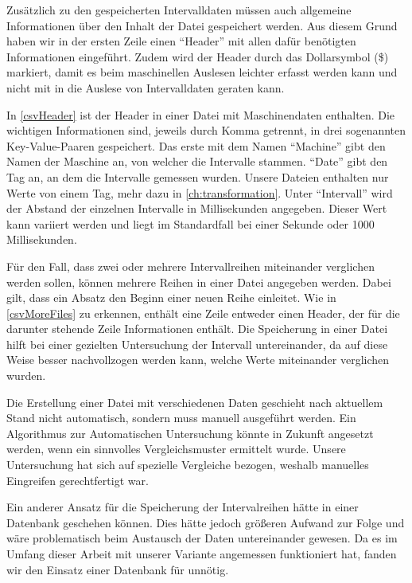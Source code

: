 \newpage
{}
Zusätzlich zu den gespeicherten Intervalldaten müssen auch allgemeine Informationen über den Inhalt der Datei gespeichert werden. Aus diesem Grund haben wir in der ersten Zeile einen \enquote{Header} mit allen dafür benötigten Informationen eingeführt. Zudem wird der Header durch das Dollarsymbol (\$) markiert, damit es beim maschinellen Auslesen leichter erfasst werden kann und nicht mit in die Auslese von Intervalldaten geraten kann.


In \autoref{csvHeader} ist der Header in einer Datei mit Maschinendaten enthalten. Die wichtigen Informationen sind, jeweils durch Komma getrennt, in drei sogenannten Key-Value-Paaren gespeichert. Das erste mit dem Namen \enquote{Machine} gibt den Namen der Maschine an, von welcher die Intervalle stammen. \enquote{Date} gibt den Tag an, an dem die Intervalle gemessen wurden. Unsere Dateien enthalten nur Werte von einem Tag, mehr dazu in \autoref{ch:transformation}. Unter \enquote{Intervall} wird der Abstand der einzelnen Intervalle in Millisekunden angegeben. Dieser Wert kann variiert werden und liegt im Standardfall bei einer Sekunde oder 1000 Millisekunden.

\vspace{60pt}


\newpage
{}
Für den Fall, dass zwei oder mehrere Intervallreihen miteinander verglichen werden sollen, können mehrere Reihen in einer Datei angegeben werden. Dabei gilt, dass ein Absatz den Beginn einer neuen Reihe einleitet. Wie in \autoref{csvMoreFiles} zu erkennen, enthält eine Zeile entweder einen Header, der für die darunter stehende Zeile Informationen enthält. Die Speicherung in einer Datei hilft bei einer gezielten Untersuchung der Intervall untereinander, da auf diese Weise besser nachvollzogen werden kann, welche Werte miteinander verglichen wurden.

\vspace{30pt}



\vspace{20pt}
Die Erstellung einer Datei mit verschiedenen Daten geschieht nach aktuellem Stand nicht automatisch, sondern muss manuell ausgeführt werden. Ein Algorithmus zur Automatischen Untersuchung könnte in Zukunft angesetzt werden, wenn ein sinnvolles Vergleichsmuster ermittelt wurde. Unsere Untersuchung hat sich auf spezielle Vergleiche bezogen, weshalb manuelles Eingreifen gerechtfertigt war. 


Ein anderer Ansatz für die Speicherung der Intervalreihen hätte in einer Datenbank geschehen können. Dies hätte jedoch größeren Aufwand zur Folge und wäre problematisch beim Austausch der Daten untereinander gewesen. Da es im Umfang dieser Arbeit mit unserer Variante angemessen funktioniert hat, fanden wir den Einsatz einer Datenbank für unnötig.